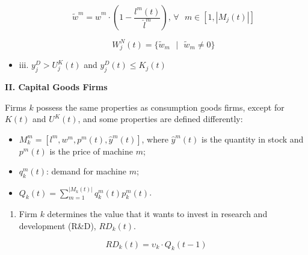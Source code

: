 \documentclass[11pt,]{article}
\providecommand{\tightlist}{%
\setlength{\itemsep}{0pt}\setlength{\parskip}{0pt}}
\begin{document}
\begin{itemize}
  
  \begin{equation}\label{newwages}
    \tilde{w}^m = \hat{w}^m\cdot\left(1 - \frac{l^m(t)}{\hat{l}^m}\right) \text{, } \forall \text{ }m \in [1,|M_j(t)|]
  \end{equation}
  
  \begin{equation}\label{offerings}
    W^N_j(t) = \{\tilde{w}_m \text{ } | \text{ } \tilde{w}_m \neq 0 \}
  \end{equation}
  

  \item[] iii. $y_j^D > U^K_j(t)$ and $y_j^D(t) \leq K_j(t)$  
  

\end{itemize}

\textbf{II. Capital Goods Firms}

Firms \(k\) possess the same properties as consumption goods firms,
except for \(K(t)\) and \(U^K(t)\), and some properties are defined
differently:

\begin{itemize}
\tightlist
\item
  \(M^m_k = [l^m, w^m, p^m(t),\hat{y}^m(t)]\), where \(\hat{y}^m(t)\) is
  the quantity in stock and \(p^m(t)\) is the price of machine \(m\);
\item
  \(q_k^m(t)\): demand for machine \(m\);
\item
  \(Q_k(t) = \sum_{m=1}^{|M_k(t)|} q_k^m(t)p_k^m(t)\).
\end{itemize}

\begin{enumerate}
\def\labelenumi{\alph{enumi}.}
\tightlist
\item
  Firm \(k\) determines the value that it wants to invest in research
  and development (R\&D), \(RD_k(t)\).
\end{enumerate}

\begin{equation}
  RD_k(t) = \upsilon_k \cdot Q_k(t-1) 
\end{equation}
\end{document}
